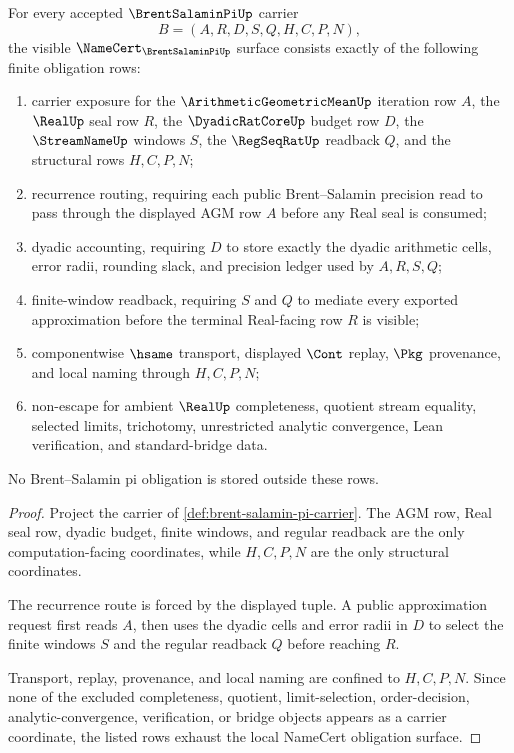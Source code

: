 \begin{theorem}
\label{thm:brent-salamin-pi-namecert-obligations}
For every accepted $\BrentSalaminPiUp$ carrier
$$
B=(A,R,D,S,Q,H,C,P,N),
$$
the visible $\NameCert_{\BrentSalaminPiUp}$ surface consists exactly of the following finite obligation rows:
\begin{enumerate}
\item carrier exposure for the $\ArithmeticGeometricMeanUp$ iteration row $A$, the $\RealUp$ seal row $R$, the $\DyadicRatCoreUp$ budget row $D$, the $\StreamNameUp$ windows $S$, the $\RegSeqRatUp$ readback $Q$, and the structural rows $H,C,P,N$;
\item recurrence routing, requiring each public Brent--Salamin precision read to pass through the displayed AGM row $A$ before any Real seal is consumed;
\item dyadic accounting, requiring $D$ to store exactly the dyadic arithmetic cells, error radii, rounding slack, and precision ledger used by $A,R,S,Q$;
\item finite-window readback, requiring $S$ and $Q$ to mediate every exported approximation before the terminal Real-facing row $R$ is visible;
\item componentwise $\hsame$ transport, displayed $\Cont$ replay, $\Pkg$ provenance, and local naming through $H,C,P,N$;
\item non-escape for ambient $\RealUp$ completeness, quotient stream equality, selected limits, trichotomy, unrestricted analytic convergence, Lean verification, and standard-bridge data.
\end{enumerate}
No Brent--Salamin pi obligation is stored outside these rows.
\end{theorem}
\begin{proof}
Project the carrier of \autoref{def:brent-salamin-pi-carrier}. The AGM row, Real seal row, dyadic budget, finite windows, and regular readback are the only computation-facing coordinates, while $H,C,P,N$ are the only structural coordinates.

The recurrence route is forced by the displayed tuple. A public approximation request first reads $A$, then uses the dyadic cells and error radii in $D$ to select the finite windows $S$ and the regular readback $Q$ before reaching $R$.

Transport, replay, provenance, and local naming are confined to $H,C,P,N$. Since none of the excluded completeness, quotient, limit-selection, order-decision, analytic-convergence, verification, or bridge objects appears as a carrier coordinate, the listed rows exhaust the local NameCert obligation surface.
\end{proof}

